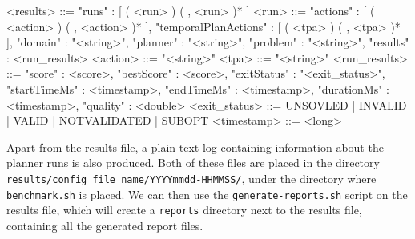 \begin{codesmall}
<results> ::= { "runs" : [ ( <run> ) ( , <run> )* ] }
<run> ::= { "actions" : [ ( <action> ) ( , <action> )* ],
            "temporalPlanActions" : [ ( <tpa> ) ( , <tpa> )* ],
            "domain" : "<string>",
            "planner" : "<string>",
            "problem" : "<string>",
            "results" : <run_results> }
<action> ::= "<string>"
<tpa> ::= "<string>"
<run_results> ::= { "score" : <score>,
                    "bestScore" : <score>,
                    "exitStatus" : "<exit_status>",
                    "startTimeMs" : <timestamp>,
                    "endTimeMs" : <timestamp>,
                    "durationMs" : <timestamp>,
                    "quality" : <double> }
<exit_status> ::= UNSOVLED | INVALID | VALID | NOTVALIDATED | SUBOPT
<timestamp> ::= <long>
\end{codesmall}

Apart from the results file, a plain text log containing information about the planner
runs is also produced. Both of these files are placed in the directory \texttt{results/config\_file\_name/YYYYmmdd-HHMMSS/}, under the directory where \texttt{benchmark.sh} is placed.
We can then use the \texttt{generate-reports.sh} script on the results file,
which will create a \texttt{reports} directory next to the results file,
containing all the generated report files.
